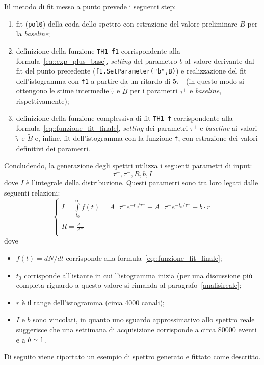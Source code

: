 \documentclass[10pt, oneside, a4paper]{article}   	%
\begin{document}
Iil metodo di fit messo a punto prevede i seguenti step:
\begin{enumerate}
 \item fit (\lstinline{pol0}) della coda dello spettro con estrazione del valore preliminare $B$ per la \textit{baseline};
 \item definizione della funzione \lstinline{TH1 f1} corrispondente alla formula~\ref{eq::exp_plus_base}, \emph{setting} del parametro $b$ al valore derivante dal fit del punto precedente (\lstinline{f1.SetParameter("b",B)}) e realizzazione del fit dell'istogramma con \lstinline{f1} a partire da un ritardo di $5\tau^-$ (in questo modo si ottengono le stime intermedie $\widetilde{\tau}$  e $\widetilde{B}$ per i parametri $\tau^+$ e \textit{baseline}, rispettivamente);
 \item definizione della funzione complessiva di fit \lstinline{TH1 f} corrispondente alla formula~\ref{eq::funzione_fit_finale}, \emph{setting} dei parametri $\tau^+$ e \textit{baseline} ai valori  $\widetilde{\tau}$  e $\widetilde{B}$ e, infine, fit dell'istogramma con la funzione \lstinline{f}, con estrazione dei valori definitivi dei parametri. 
%
\end{enumerate}  
Concludendo, la generazione degli spettri utilizza i seguenti parametri di input:
$$\tau^+,\tau^-,R,b,I$$
dove $I$ è l'integrale della distribuzione. Questi parametri sono tra loro legati dalle seguenti relazioni:
\begin{equation}
 \begin{cases}
  I = \int\limits_{t_0}^\infty f(t) = A_-\tau^-e^{-t_0 / \tau^-} + A_+\tau^+e^{-t_0 / \tau^+} + b\cdot r \\
  R = \frac{A^+}{A^-} \\
 \end{cases}
 \label{eq::condizioni_parametri}
\end{equation}
dove 
\begin{itemize}
 \item $f(t) = dN/dt$ corrisponde alla formula~\ref{eq::funzione_fit_finale};
 \item $t_0$ corrisponde all'istante in cui l'istogramma inizia (per una discussione più completa riguardo a questo valore si rimanda al paragrafo~\cref{analisireale};
 \item $r$ è il range dell'istogramma (circa 4000 canali);
 \item $I$ e $b$ sono vincolati, in quanto uno sguardo approssimativo allo spettro reale suggerisce che una settimana di acquisizione corrisponde a circa 80000 eventi e a $b \ {\raise.17ex\hbox{$\scriptstyle\sim$}} \ 1 $.
\end{itemize}
Di seguito viene riportato un esempio di spettro generato e fittato come descritto.
\end{document}
